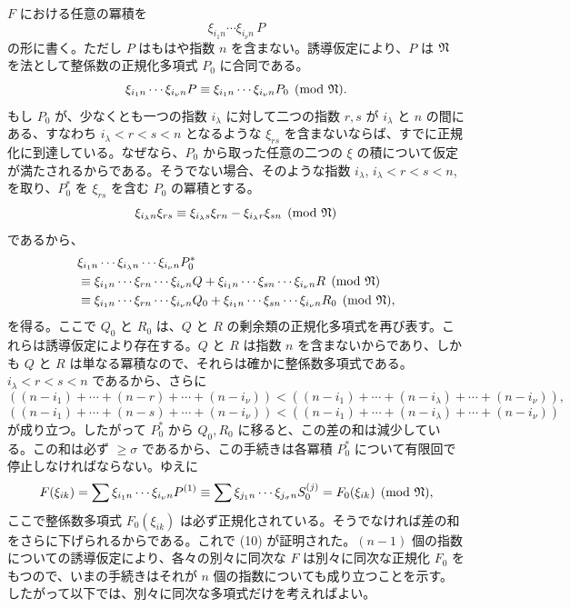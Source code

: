 \(F\) における任意の冪積を
\[
        \xi_{i_1n}\cdots\xi_{i_\nu n}\,P
\]
の形に書く。ただし \(P\) はもはや指数 \(n\) を含まない。誘導仮定により、\(P\) は \(\mathfrak N\) を法として整係数の正規化多項式 \(P_0\) に合同である。
\[
        \xi_{i_1n}\cdots\xi_{i_\nu n}P
        \equiv
        \xi_{i_1n}\cdots\xi_{i_\nu n}P_0
        \pmod{\mathfrak N}.
\]
もし \(P_0\) が、少なくとも一つの指数 \(i_\lambda\) に対して二つの指数 \(r,s\) が \(i_\lambda\) と \(n\) の間にある、すなわち \(i_\lambda<r<s<n\) となるような \(\xi_{rs}\) を含まないならば、すでに正規化に到達している。なぜなら、\(P_0\) から取った任意の二つの \(\xi\) の積について仮定が満たされるからである。そうでない場合、そのような指数 \(i_\lambda\), \(i_\lambda<r<s<n\), を取り、\(P_0^*\) を \(\xi_{rs}\) を含む \(P_0\) の冪積とする。
\[
        \xi_{i_\lambda n}\xi_{rs}\equiv
        \xi_{i_\lambda s}\xi_{rn}-\xi_{i_\lambda r}\xi_{sn}
        \pmod{\mathfrak N}
\]
であるから、
\begin{align*}
 &\xi_{i_1n}\cdots\xi_{i_\lambda n}\cdots\xi_{i_\nu n}P_0^*\\
 &\equiv
 \xi_{i_1n}\cdots\xi_{rn}\cdots\xi_{i_\nu n}Q
 +
 \xi_{i_1n}\cdots\xi_{sn}\cdots\xi_{i_\nu n}R
 \pmod{\mathfrak N}\\
 &\equiv
 \xi_{i_1n}\cdots\xi_{rn}\cdots\xi_{i_\nu n}Q_0
 +
 \xi_{i_1n}\cdots\xi_{sn}\cdots\xi_{i_\nu n}R_0
 \pmod{\mathfrak N},
\end{align*}
を得る。ここで \(Q_0\) と \(R_0\) は、\(Q\) と \(R\) の剰余類の正規化多項式を再び表す。これらは誘導仮定により存在する。\(Q\) と \(R\) は指数 \(n\) を含まないからであり、しかも \(Q\) と \(R\) は単なる冪積なので、それらは確かに整係数多項式である。\(i_\lambda<r<s<n\) であるから、さらに
\[
 ((n-i_1)+\cdots+(n-r)+\cdots+(n-i_\nu))
 <
 ((n-i_1)+\cdots+(n-i_\lambda)+\cdots+(n-i_\nu)),
\]
\[
 ((n-i_1)+\cdots+(n-s)+\cdots+(n-i_\nu))
 <
 ((n-i_1)+\cdots+(n-i_\lambda)+\cdots+(n-i_\nu))
\]
が成り立つ。したがって \(P_0^*\) から \(Q_0,R_0\) に移ると、この差の和は減少している。この和は必ず \(\ge\sigma\) であるから、この手続きは各冪積 \(P_0^*\) について有限回で停止しなければならない。ゆえに
\[
        F(\xi_{ik})
        =
        \sum \xi_{i_1n}\cdots\xi_{i_\nu n}P^{(1)}
        \equiv
        \sum \xi_{j_1n}\cdots\xi_{j_\sigma n}S_0^{(j)}
        =
        F_0(\xi_{ik})\pmod{\mathfrak N},
\]
ここで整係数多項式 \(F_0(\xi_{ik})\) は必ず正規化されている。そうでなければ差の和をさらに下げられるからである。これで (10) が証明された。\((n-1)\) 個の指数についての誘導仮定により、各々の別々に同次な \(F\) は別々に同次な正規化 \(F_0\) をもつので、いまの手続きはそれが \(n\) 個の指数についても成り立つことを示す。したがって以下では、別々に同次な多項式だけを考えればよい。

